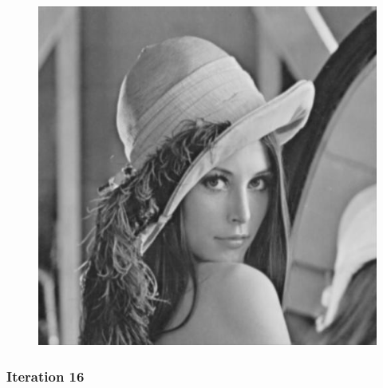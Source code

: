 \documentclass[11pt]{article}
\makeatletter
\def\maxwidth{\ifdim\Gin@nat@width>\linewidth\linewidth
    \else\Gin@nat@width\fi}
\let\Oldincludegraphics\includegraphics
\renewcommand{\includegraphics}[1]{\Oldincludegraphics[width=.8\maxwidth]{#1}}
\makeatother
\begin{document}
\begin{figure}[!htbp]
	\centering
	\includegraphics{"7th iterations_const"}
	\label{fig:7th-iterationsconst}
\end{figure}
\clearpage
    \hypertarget{iteration-16}{%
\subsubsection{Iteration 16}\label{iteration-16}}
\end{document}
